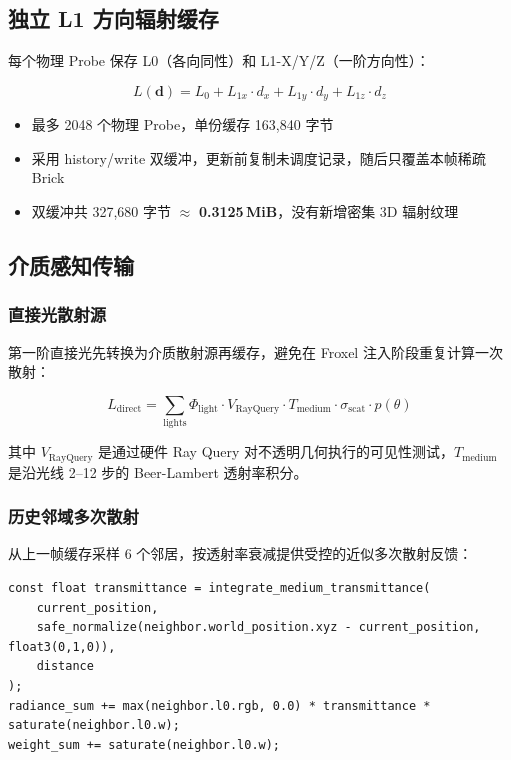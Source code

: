 \documentclass[11pt,a4paper]{article}
\begin{document}
\subsection{独立 L1 方向辐射缓存}

每个物理 Probe 保存 L0（各向同性）和 L1-X/Y/Z（一阶方向性）：

\begin{equation}
L(\mathbf{d}) = L_0 + L_{1x} \cdot d_x + L_{1y} \cdot d_y + L_{1z} \cdot d_z
\end{equation}

\begin{itemize}
    \item 最多 2048 个物理 Probe，单份缓存 163,840 字节
    \item 采用 history/write 双缓冲，更新前复制未调度记录，随后只覆盖本帧稀疏 Brick
    \item 双缓冲共 327,680 字节 $\approx$ \textbf{0.3125\,MiB}，没有新增密集 3D 辐射纹理
\end{itemize}

\subsection{介质感知传输}

\subsubsection{直接光散射源}

第一阶直接光先转换为介质散射源再缓存，避免在 Froxel 注入阶段重复计算一次散射：

\begin{equation}
L_{\text{direct}} = \sum_{\text{lights}} \Phi_{\text{light}} \cdot V_{\text{RayQuery}} \cdot T_{\text{medium}} \cdot \sigma_{\text{scat}} \cdot p(\theta)
\end{equation}

其中 $V_{\text{RayQuery}}$ 是通过硬件 Ray Query 对不透明几何执行的可见性测试，$T_{\text{medium}}$ 是沿光线 2--12 步的 Beer-Lambert 透射率积分。

\subsubsection{历史邻域多次散射}

从上一帧缓存采样 6 个邻居，按透射率衰减提供受控的近似多次散射反馈：

\begin{lstlisting}[language=HLSL, caption={UpdateRadianceCache.hlsl 中的邻域多次散射}]
const float transmittance = integrate_medium_transmittance(
    current_position,
    safe_normalize(neighbor.world_position.xyz - current_position, float3(0,1,0)),
    distance
);
radiance_sum += max(neighbor.l0.rgb, 0.0) * transmittance * saturate(neighbor.l0.w);
weight_sum += saturate(neighbor.l0.w);
\end{lstlisting}
\end{document}
